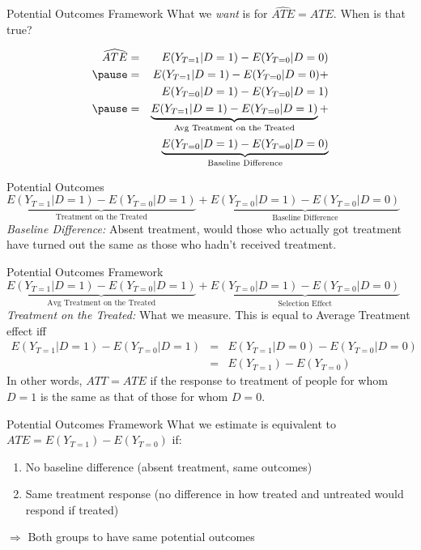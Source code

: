 \documentclass[11pt]{beamer}
\begin{document}
\begin{frame}[c]{Potential Outcomes Framework}
What we \emph{want} is for $\widehat{ATE} = ATE$. When is that true?

  \begin{eqnarray}
  \widehat{ATE} &=&E(Y_{T=1}|D=1) - E(Y_{T=0}|D=0) \nonumber \\
                \pause &=&E(Y_{T=1}|D=1) - E(Y_{T=0}|D=0) + \nonumber \\
                &&E(Y_{T=0}|D=1) - E(Y_{T=0}|D=1)  \nonumber \\
               \pause &=& \underbrace{E(Y_{T=1}|D=1) - E(Y_{T=0}|D=1)}_{\text{Avg Treatment on the Treated}} + \nonumber \\ &&\underbrace{E(Y_{T=0}|D=1) - E(Y_{T=0}|D=0)}_{\text{Baseline Difference}} \nonumber
  \end{eqnarray}
\end{frame}

\begin{frame}[c]{Potential Outcomes}
$\underbrace{E(Y_{T=1}|D=1) - E(Y_{T=0}|D=1)}_{\text{Treatment on the Treated}} + \underbrace{E(Y_{T=0}|D=1) - E(Y_{T=0}|D=0)}_{\text{Baseline Difference}}$ \\
\vspace*{1cm}
\emph{Baseline Difference:} Absent treatment, would those who actually got treatment have turned out the same as those who hadn't received treatment.
\end{frame}

\begin{frame}[c]{Potential Outcomes Framework}
$\underbrace{E(Y_{T=1}|D=1) - E(Y_{T=0}|D=1)}_{\text{Avg Treatment on the Treated}} + \underbrace{E(Y_{T=0}|D=1) - E(Y_{T=0}|D=0)}_{\text{Selection Effect}}$ \\
\vspace*{1cm}
\emph{Treatment on the Treated:} What we measure. This is equal to Average Treatment effect iff
\begin{eqnarray}
E(Y_{T=1}|D=1) - E(Y_{T=0}|D=1) &=& E(Y_{T=1}|D=0) - E(Y_{T=0}|D=0)\nonumber \\
                                &=& E(Y_{T=1}) - E(Y_{T=0})\nonumber
\end{eqnarray}
In other words, $ATT = ATE$ if the response to treatment of people for whom $D=1$ is the same as that of those for whom $D=0$.
\end{frame}

\begin{frame}[c]{Potential Outcomes Framework}
What we estimate is equivalent to $ATE = E(Y_{T=1}) - E(Y_{T=0})$ if:

\begin{enumerate}
  \item No baseline difference (absent treatment, same outcomes)
  \item Same treatment response (no difference in how treated and untreated would respond if treated)
\end{enumerate}
$\Rightarrow$ Both groups to have \alert{same potential outcomes}
\end{frame}
\end{document}
